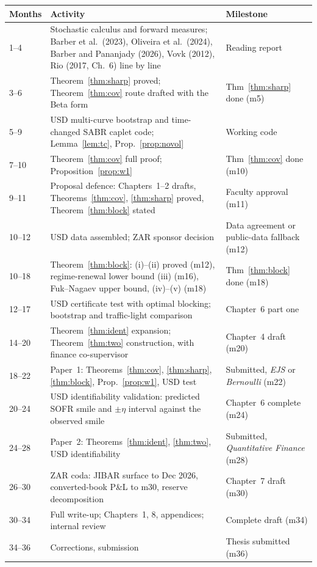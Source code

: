\documentclass[11pt,a4paper]{article}
\theoremstyle{plain}
\theoremstyle{definition}
\theoremstyle{remark}
\begin{document}
\begin{center}\small
\begin{tabular}{@{}p{}p{}p{}@{}}
\toprule
Months & Activity & Milestone \\
\midrule
1--4 & Stochastic calculus and forward measures; Barber et al.\ (2023), Oliveira et al.\ (2024), Barber and Pananjady (2026), Vovk (2012), Rio (2017, Ch.~6) line by line & Reading report \\
3--6 & Theorem~\ref{thm:sharp} proved; Theorem~\ref{thm:cov} route drafted with the Beta form & Thm~\ref{thm:sharp} done (m5) \\
5--9 & USD multi-curve bootstrap and time-changed SABR caplet code; Lemma~\ref{lem:tc}, Prop.~\ref{prop:novol} & Working code \\
7--10 & Theorem~\ref{thm:cov} full proof; Proposition~\ref{prop:w1} & Thm~\ref{thm:cov} done (m10) \\
9--11 & Proposal defence: Chapters~1--2 drafts, Theorems~\ref{thm:cov}, \ref{thm:sharp} proved, Theorem~\ref{thm:block} stated & Faculty approval (m11) \\
10--12 & USD data assembled; ZAR sponsor decision & Data agreement or public-data fallback (m12) \\
10--18 & Theorem~\ref{thm:block}: (i)--(ii) proved (m12), regime-renewal lower bound (iii) (m16), Fuk--Nagaev upper bound, (iv)--(v) (m18) & Thm~\ref{thm:block} done (m18) \\
12--17 & USD certificate test with optimal blocking; bootstrap and traffic-light comparison & Chapter~6 part one \\
14--20 & Theorem~\ref{thm:ident} expansion; Theorem~\ref{thm:two} construction, with finance co-supervisor & Chapter~4 draft (m20) \\
18--22 & Paper~1: Theorems~\ref{thm:cov}, \ref{thm:sharp}, \ref{thm:block}, Prop.~\ref{prop:w1}, USD test & Submitted, \emph{EJS} or \emph{Bernoulli} (m22) \\
20--24 & USD identifiability validation: predicted SOFR smile and $\pm\eta$ interval against the observed smile & Chapter~6 complete (m24) \\
24--28 & Paper~2: Theorems~\ref{thm:ident}, \ref{thm:two}, USD identifiability & Submitted, \emph{Quantitative Finance} (m28) \\
26--30 & ZAR coda: JIBAR surface to Dec 2026, converted-book P\&L to m30, reserve decomposition & Chapter~7 draft (m30) \\
30--34 & Full write-up; Chapters~1, 8, appendices; internal review & Complete draft (m34) \\
34--36 & Corrections, submission & Thesis submitted (m36) \\
\bottomrule
\end{tabular}
\end{center}
\end{document}
